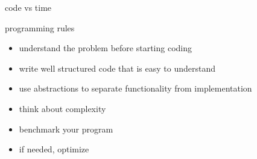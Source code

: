 \begin{frame}{code vs time}

\end{frame}

\begin{frame}{programming rules}

\begin{itemize}
\pause
\item understand the problem before starting coding
\pause
\item write well structured code that is easy to understand
\pause
\item use abstractions to separate functionality from implementation
\pause
\item think about complexity
\pause
\item benchmark your program 
\pause
\item if needed, optimize
\end{itemize}

\end{frame}





